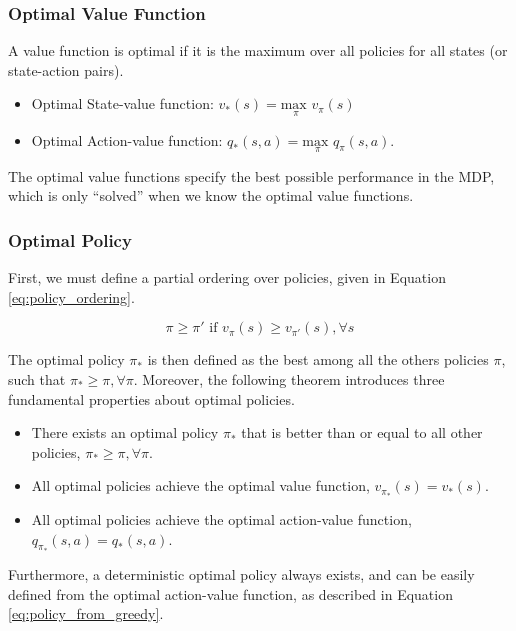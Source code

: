 \subsubsection{Optimal Value Function}

A value function is optimal if it is the maximum over all policies for all states (or state-action pairs).
\begin{itemize}
\item
	Optimal State-value function: $v_*(s) = \underset{\pi}{\textrm{max }} v_\pi(s)$
\item
	Optimal Action-value function: $q_*(s, a) = \underset{\pi}{\textrm{max }} q_\pi(s, a)$.
\end{itemize}

The optimal value functions specify the best possible performance in the MDP, which is only ``solved'' when we know the optimal value functions.

\subsubsection{Optimal Policy}

First, we must define a partial ordering over policies, given in Equation \eqref{eq:policy_ordering}.

\begin{equation}
\pi \geq \pi' \text{ if } v_{\pi}(s) \geq v_{\pi'}(s), \forall s
\label{eq:policy_ordering}
\end{equation}

The optimal policy $\pi_*$ is then defined as the best among all the others policies $\pi$, such that $\pi_* \geq \pi, \forall \pi$. Moreover, the following theorem introduces three fundamental properties about optimal policies.

\begin{itemize}
\item
There exists an optimal policy $\pi_*$ that is better than or equal to all other policies, $\pi_* \geq \pi, \forall \pi$.
\item
All optimal policies achieve the optimal value function, $v_{\pi_*}(s) = v_*(s)$.
\item
All optimal policies achieve the optimal action-value function, $q_{\pi_*}(s,a) = q_*(s,a)$.
\end{itemize}

Furthermore, a deterministic optimal policy always exists, and can be easily defined from the optimal action-value function, as described in Equation \eqref{eq:policy_from_greedy}.

